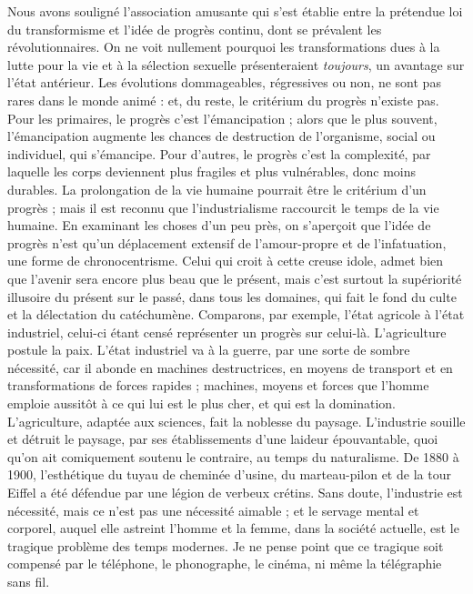 \documentclass[french,twoside]{book} %
\begin{document}
Nous avons souligné l’association amusante qui s’est établie entre la prétendue loi du transformisme et l’idée de progrès continu, dont se prévalent les révolutionnaires. On ne voit nullement pourquoi les transformations dues à la lutte pour la vie et à la sélection sexuelle présenteraient {\itshape toujours}, un avantage sur l’état antérieur. Les évolutions dommageables, régressives ou non, ne sont pas rares dans le monde animé : et, du reste, le critérium du progrès n’existe pas. Pour les primaires, le progrès c’est l’émancipation ; alors que le plus souvent, l’émancipation augmente les chances de destruction de l’organisme, social ou individuel, qui s’émancipe. Pour d’autres, le progrès c’est la complexité, par laquelle les corps deviennent plus fragiles et plus vulnérables, donc moins durables. La prolongation de la vie humaine pourrait être le critérium d’un progrès ; mais il est reconnu que l’industrialisme raccourcit le temps de la vie humaine. En examinant les choses d’un peu près, on s’aperçoit que l’idée de progrès n’est qu’un déplacement extensif de l’amour-propre et de l’infatuation, une forme de chronocentrisme. Celui qui croit à cette creuse idole, admet bien que l’avenir sera encore plus beau que le présent, mais c’est surtout la supériorité illusoire du présent sur le passé, dans tous les domaines, qui fait le fond du culte et la délectation du catéchumène. Comparons, par exemple, l’état agricole à l’état industriel, celui-ci étant censé représenter un progrès sur celui-là. L’agriculture postule la paix. L’état industriel va à la guerre, par une sorte de sombre nécessité, car il abonde en machines destructrices, en moyens de transport et en transformations de forces rapides ; machines, moyens et forces que l’homme emploie aussitôt à ce qui lui est le plus cher, et qui est la domination. L’agriculture, adaptée aux sciences, fait la noblesse du paysage. L’industrie souille et détruit le paysage, par ses établissements d’une laideur épouvantable, quoi qu’on ait comiquement soutenu le contraire, au temps du naturalisme. De 1880 à 1900, l’esthétique du tuyau de cheminée d’usine, du marteau-pilon et de la tour Eiffel a été défendue par une légion de verbeux crétins. Sans doute, l’industrie est nécessité, mais ce n’est pas une nécessité aimable ; et le servage mental et corporel, auquel elle astreint l’homme et la femme, dans la société actuelle, est le tragique problème des temps modernes. Je ne pense point que ce tragique soit compensé par le téléphone, le phonographe, le cinéma, ni même la télégraphie sans fil.\par
\end{document}
